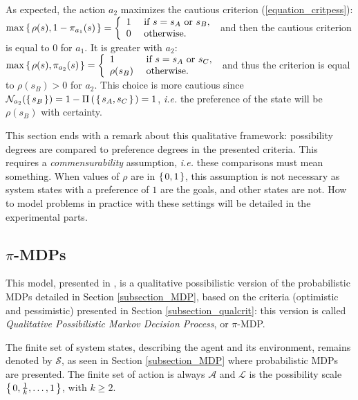 As expected, the action $a_2$ maximizes the cautious criterion (\ref{equation_critpess}):
$\max \left\{ \left.  \rho(s), 1-\pi_{a_1}(s)  \right. \right\} = \left \{ \begin{array}{ll}
1 & \mbox{ if } s=s_A \mbox{ or } s_B, \\
0 & \mbox{ otherwise. }
\end{array}  \right.$ and then the cautious criterion 
is equal to $0$ for $a_1$.
It is greater with $a_2$: 
$\max \left\{ \left.  \rho(s), \pi_{a_2}(s)  \right. \right\} = \left \{ \begin{array}{ll}
1 &  \mbox{ if } s=s_A \mbox{ or } s_C, \\
\rho(s_B) & \mbox{ otherwise. }
\end{array}  \right.$ and thus the criterion is equal to $\rho(s_B)>0$ for $a_2$.
This choice is more cautious since $\mathcal{N}_{a_2}(\left\{ \left.  s_B \right. \right\} ) = 1-\Pi \left( \left.  \left\{ \left.  s_A , s_C  \right. \right\}  \right. \right) = 1$, 
\textit{i.e.} the preference of the state will be $\rho(s_B)$ with certainty.

This section ends with a remark about this qualitative framework:
possibility degrees are compared to preference degrees in the presented criteria.
This requires a \textit{commensurability} assumption,
\textit{i.e.} these comparisons must mean something. 
When values of $\rho$ are in $\left\{ \left.  0 , 1  \right. \right\}$, 
this assumption is not necessary as system states with a preference of $1$
are the goals, and other states are not.
How to model problems in practice 
with these settings will be detailed in the experimental parts.
\subsection{$\pi$-MDPs}
\label{subsection_piMDPs}
This model, presented in \cite{Sabbadin2001287,conf/ecai/Sabbadi00,Sabbadin:1999:pipomdp}, 
is a qualitative possibilistic version of the probabilistic MDPs detailed in Section \ref{subsection_MDP},
based on the criteria (optimistic and pessimistic) presented in Section \ref{subsection_qualcrit}:
this version is called \textit{Qualitative Possibilistic Markov Decision Process}, or $\pi$-MDP.

The finite set of system states, describing the agent and its environment, 
remains denoted by $\mathcal{S}$, as seen in Section \ref{subsection_MDP} 
where probabilistic MDPs are presented.
The finite set of action is always $\mathcal{A}$ 
and $\mathcal{L}$ is the possibility scale $\left\{ \left.  0, \frac{1}{k}, \ldots, 1  \right. \right\}$,
with $k\geqslant2$.

